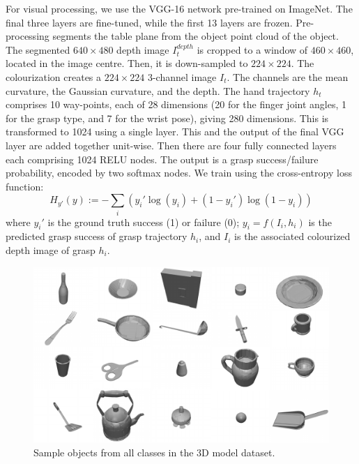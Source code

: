For visual processing, we use the VGG-16 network pre-trained on ImageNet. The final three layers are fine-tuned, while the first 13 layers are frozen. Pre-processing segments the table plane from the object point cloud of the object. The segmented $640 \times 480$ depth image $I_{t}^{depth}$ is cropped to a window of $460 \times 460$, located in the image centre. Then, it is down-sampled to $224 \times 224$. The colourization creates a $224 \times 224$ 3-channel image $I_t$. The channels  are the mean curvature, the Gaussian curvature, and the depth. %
The hand trajectory $h_t$ comprises 10 way-points, each of 28 dimensions (20 for the finger joint angles, 1 for the grasp type, and 7 for the wrist pose), giving 280 dimensions. This is transformed to 1024 using a single layer. This and the output of the final VGG layer are added together unit-wise. Then there are four fully connected layers each comprising 1024 RELU nodes. The output is a grasp success/failure probability, encoded by two softmax nodes.  We train using the cross-entropy loss function:
\begin{equation}
H_{y'}(y) := - \sum_{i} ({y_i' \log(y_i) + (1-y_i') \log (1-y_i)})
\label{equation:crossentropy}
\end{equation}
where $y_i'$ is the ground truth success (1) or failure (0); $y_i = f(I_i, h_i)$ is the predicted grasp success of grasp trajectory $h_i$, and $I_i$ is the associated colourized depth image of grasp $h_i$.
\begin{figure}
\begin{center}
  \includegraphics[width=0.9\linewidth]{images/allObjects-small.pdf}
  \end{center}
  \caption{Sample objects from all classes in the 3D model dataset.}
  \label{fig:allObjects}
\end{figure}
